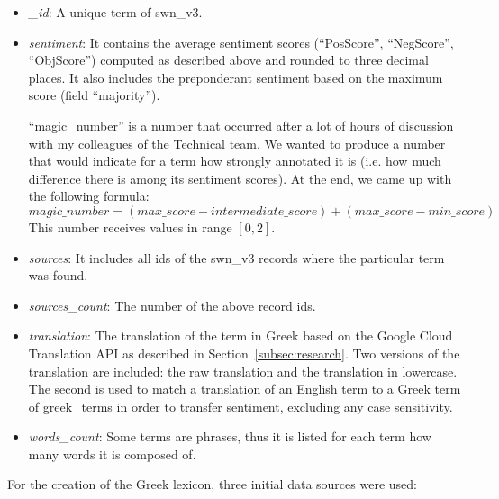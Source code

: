 \begin{itemize}
 \item \emph{\_id}: A unique term of swn\_v3.

 \item \emph{sentiment}: It contains the average sentiment scores
 (``PosScore'', ``NegScore'', ``ObjScore'') computed as described above
 and rounded to three decimal places.
 It also includes the preponderant sentiment based on the maximum score
 (field ``majority'').

 ``magic\_number'' is a number that occurred after a lot of hours
 of discussion with my colleagues of the Technical team.
 We wanted to produce a number that would indicate for a term
 how strongly annotated it is
 (i.e. how much difference there is among its sentiment scores).
 At the end, we came up with the following formula: \\
 $magic\_number = (max\_score - intermediate\_score) + (max\_score - min\_score)$ \\
 This number receives values in range $[0,2]$.
 
 \item \emph{sources}: It includes all ids of the swn\_v3 records
 where the particular term was found.
 
 \item \emph{sources\_count}: The number of the above record ids.
 
 \item \emph{translation}: The translation of the term in Greek
 based on the Google Cloud Translation API
 as described in Section~\ref{subsec:research}.
 Two versions of the translation are included:
 the raw translation and the translation in lowercase.
 The second is used to match a translation of an English term
 to a Greek term of greek\_terms in order to transfer sentiment,
 excluding any case sensitivity.
 
 \item \emph{words\_count}: Some terms are phrases, thus
 it is listed for each term how many words it is composed of.
\end{itemize}

\label{subsubsubsec:greek-terms}

For the creation of the Greek lexicon,
three initial data sources were used:

